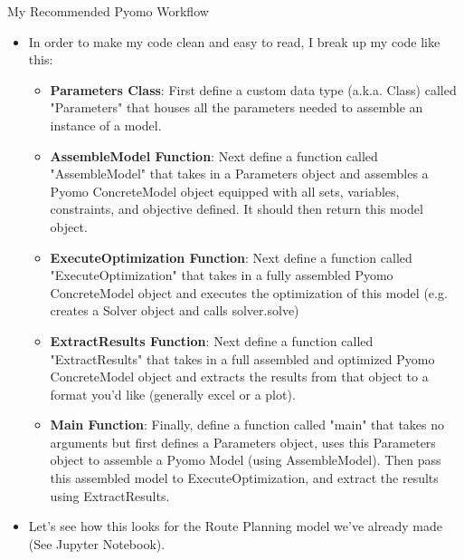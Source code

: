 \documentclass[10pt, aspectratio=169]{beamer}
\begin{document}
\begin{frame}{My Recommended Pyomo Workflow}
    \begin{itemize}
        \item In order to make my code clean and easy to read, I break up my code like this:
        \begin{itemize}
            \item \textbf{Parameters Class}: First define a custom data type (a.k.a. Class) called "Parameters" that houses all the parameters needed to assemble an instance of a model.
            \item \textbf{AssembleModel Function}: Next define a function called "AssembleModel" that takes in a Parameters object and assembles a Pyomo ConcreteModel object equipped with all sets, variables, constraints, and objective defined. It should then return this model object.
            \item \textbf{ExecuteOptimization Function}: Next define a function called "ExecuteOptimization" that takes in a fully assembled Pyomo ConcreteModel object and executes the optimization of this model (e.g. creates a Solver object and calls solver.solve)
            \item \textbf{ExtractResults Function}: Next define a function called "ExtractResults" that takes in a full assembled and optimized Pyomo ConcreteModel object and extracts the results from that object to a format you'd like (generally excel or a plot).
            \item \textbf{Main Function}: Finally, define a function called "main" that takes no arguments but first defines a Parameters object, uses this Parameters object to assemble a Pyomo Model (using AssembleModel). Then pass this assembled model to ExecuteOptimization, and extract the results using ExtractResults.
        \end{itemize}
        \item Let's see how this looks for the Route Planning model we've already made (See Jupyter Notebook).
    \end{itemize}
\end{frame}
\end{document}
